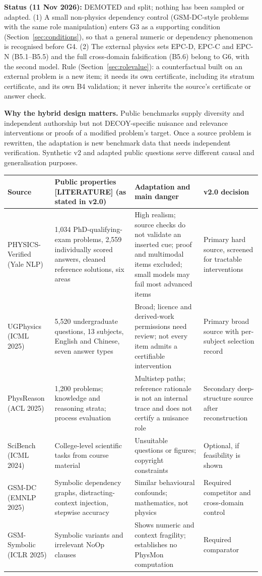 \documentclass[10pt,a4paper]{article}
\newcommand{\tg}[1]{\textsc{[#1]}}
\begin{document}
\textbf{Status (11 Nov 2026):} DEMOTED and split; nothing has been sampled or adapted. (1) A small non-physics
dependency control (GSM-DC-style problems with the same role manipulation) enters G3 as a supporting condition
(Section~\ref{sec:conditions}), so that a general numeric or dependency phenomenon is recognised before G4.
(2) The external physics sets EPC-D, EPC-C and EPC-N (B5.1--B5.5) and the full cross-domain falsification (B5.6)
belong to G6, with the second model. Rule (Section~\ref{sec:rolevalue}): a counterfactual built on an external
problem is a new item; it needs its own certificate, including its stratum certificate, and its own B4
validation; it never inherits the source's certificate or answer check.

\textbf{Why the hybrid design matters.} Public benchmarks supply diversity and independent authorship but not
DECOY-specific nuisance and relevance interventions or proofs of a modified problem's target. Once a source problem
is rewritten, the adaptation is new benchmark data that needs independent verification. Synthetic v2 and adapted
public questions serve different causal and generalisation purposes.

\begin{center}\small
\begin{tabularx}{\linewidth}{@{}P{2.4cm}P{4.2cm}LP{3.1cm}@{}}
\toprule
Source & Public properties \tg{LITERATURE} (as stated in v2.0) & Adaptation and main danger & v2.0 decision \\
\midrule
PHYSICS-Verified (Yale NLP) & 1,034 PhD-qualifying-exam problems, 2,559 individually scored answers, cleaned
reference solutions, six areas & High realism; source checks do not validate an inserted cue; proof and
multimodal items excluded; small models may fail most advanced items & Primary hard source, screened for
tractable interventions \\
UGPhysics (ICML 2025) & 5,520 undergraduate questions, 13 subjects, English and Chinese, seven answer types & Broad;
licence and derived-work permissions need review; not every item admits a certifiable intervention & Primary
broad source with per-subject selection record \\
PhysReason (ACL 2025) & 1,200 problems; knowledge and reasoning strata; process evaluation & Multistep paths;
reference rationale is not an internal trace and does not certify a nuisance role & Secondary deep-structure
source after reconstruction \\
SciBench (ICML 2024) & College-level scientific tasks from course material & Unsuitable questions or figures;
copyright constraints & Optional, if feasibility is shown \\
GSM-DC (EMNLP 2025) & Symbolic dependency graphs, distracting-context injection, stepwise accuracy & Similar
behavioural confounds; mathematics, not physics & Required competitor and cross-domain control \\
GSM-Symbolic (ICLR 2025) & Symbolic variants and irrelevant NoOp clauses & Shows numeric and context
fragility; establishes no PhysMon computation & Required comparator \\
\bottomrule
\end{tabularx}
\end{center}
\end{document}
